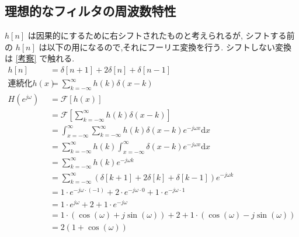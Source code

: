 \documentclass[12pt]{jsarticle}
\begin{document}
      \subsection{理想的なフィルタの周波数特性} \label{理想的なフィルタの周波数特性}
        $h[n]$ は因果的にするために右シフトされたものと考えられるが, シフトする前の $h[n]$ は以下の用になるので,それにフーリエ変換を行う.
        シフトしない変換は \ref{考察} で触れる.
        \begin{align*}
          h [n] &= \delta [n+1] + 2 \delta [n] + \delta [n-1] \\
          \text{連続化} h(x) &= \sum_{k=- \infty}^{\infty} h(k) \delta(x-k)\\
          H(e^{j \omega})
            &= \mathscr{F} \left[ h(x) \right] \\
            &= \mathscr{F} \left[ \sum_{k=- \infty}^{\infty} h(k) \delta(x-k) \right] \\
            &= \int_{x=-\infty}^{\infty} \sum_{k=- \infty}^{\infty} h(k) \delta(x-k) e^{-j \omega x} \mathrm{d} x \\
            &= \sum_{k=- \infty}^{\infty} h(k) \int_{x=-\infty}^{\infty} \delta(x-k) e^{-j \omega x} \mathrm{d} x \\
            &= \sum_{k=- \infty}^{\infty} h(k) e^{-j \omega k} \\
            &= \sum_{k=- \infty}^{\infty} \left( \delta [k+1] + 2 \delta [k] + \delta [k-1] \right) e^{-j \omega k} \\
            &= 1 \cdot e^{-j \omega \cdot (-1)} + 2 \cdot e^{-j \omega \cdot 0} + 1 \cdot e^{-j \omega \cdot 1} \\
            &= 1 \cdot e^{j \omega} + 2 + 1 \cdot e^{-j \omega} \\
            &= 1 \cdot ( \cos (\omega) + j \sin (\omega) ) + 2 + 1 \cdot ( \cos (\omega) - j \sin (\omega) ) \\
            &= 2 (1 + \cos (\omega)) \\
        \end{align*}
        
\end{document}
